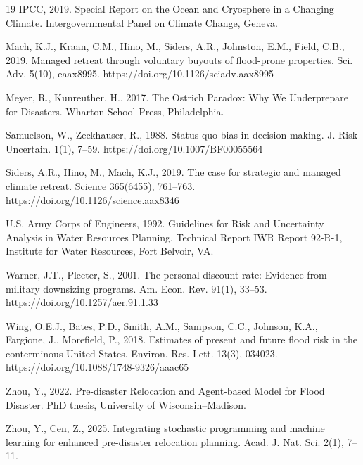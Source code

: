 \documentclass[preprint,12pt,authoryear]{elsarticle}
\begin{document}
\begin{thebibliography}{19}
IPCC, 2019. Special Report on the Ocean and Cryosphere in a Changing Climate. Intergovernmental Panel on Climate Change, Geneva.

Mach, K.J., Kraan, C.M., Hino, M., Siders, A.R., Johnston, E.M., Field, C.B., 2019. Managed retreat through voluntary buyouts of flood-prone properties. Sci. Adv. 5(10), eaax8995. https://doi.org/10.1126/sciadv.aax8995

Meyer, R., Kunreuther, H., 2017. The Ostrich Paradox: Why We Underprepare for Disasters. Wharton School Press, Philadelphia.

Samuelson, W., Zeckhauser, R., 1988. Status quo bias in decision making. J. Risk Uncertain. 1(1), 7--59. https://doi.org/10.1007/BF00055564

Siders, A.R., Hino, M., Mach, K.J., 2019. The case for strategic and managed climate retreat. Science 365(6455), 761--763. https://doi.org/10.1126/science.aax8346

U.S. Army Corps of Engineers, 1992. Guidelines for Risk and Uncertainty Analysis in Water Resources Planning. Technical Report IWR Report 92-R-1, Institute for Water Resources, Fort Belvoir, VA.

Warner, J.T., Pleeter, S., 2001. The personal discount rate: Evidence from military downsizing programs. Am. Econ. Rev. 91(1), 33--53. https://doi.org/10.1257/aer.91.1.33

Wing, O.E.J., Bates, P.D., Smith, A.M., Sampson, C.C., Johnson, K.A., Fargione, J., Morefield, P., 2018. Estimates of present and future flood risk in the conterminous United States. Environ. Res. Lett. 13(3), 034023. https://doi.org/10.1088/1748-9326/aaac65

Zhou, Y., 2022. Pre-disaster Relocation and Agent-based Model for Flood Disaster. PhD thesis, University of Wisconsin--Madison.

Zhou, Y., Cen, Z., 2025. Integrating stochastic programming and machine learning for enhanced pre-disaster relocation planning. Acad. J. Nat. Sci. 2(1), 7--11.

\end{thebibliography}
\end{document}
